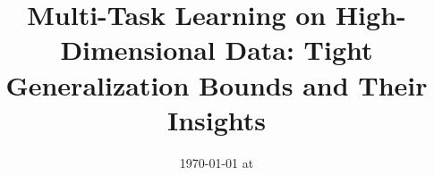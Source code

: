 \documentclass{article}
\begin{document}
\title{Multi-Task Learning on High-Dimensional Data: Tight Generalization Bounds and Their Insights}
\date{}
\maketitle
\date{{\ddmmyyyydate\today} at \currenttime}











\newpage
\appendix



\end{document}
